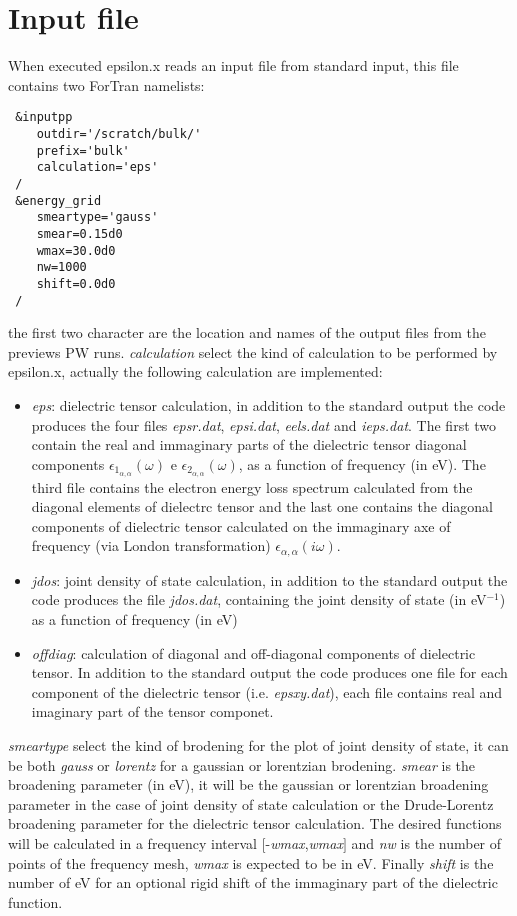 \documentclass[twocolumn]{article}
\begin{document}
\section{Input file}
When executed epsilon.x reads an input file from standard input, this file contains two ForTran namelists:
\begin{verbatim}
 &inputpp
    outdir='/scratch/bulk/'
    prefix='bulk'
    calculation='eps'
 /
 &energy_grid
    smeartype='gauss'
    smear=0.15d0
    wmax=30.0d0
    nw=1000
    shift=0.0d0
 /
\end{verbatim}
the first two character are the location and names of the output files from the previews PW runs. \emph{calculation}
select the kind of calculation to be performed by epsilon.x, actually the following calculation are implemented:
\begin{itemize}
\item  \emph{eps}: dielectric tensor calculation, in addition to the standard output the code produces the four files
\emph{epsr.dat}, \emph{epsi.dat}, \emph{eels.dat} and \emph{ieps.dat}. The first two contain the real and immaginary
parts of the dielectric
tensor diagonal components $\epsilon_{1_{\alpha,\alpha}}(\omega)$ e $\epsilon_{2_{\alpha,\alpha}}(\omega)$,
as a function of frequency (in eV). The third file contains the electron energy loss spectrum calculated from the diagonal
elements of dielectrc tensor and the last one contains the diagonal components of
dielectric tensor calculated on the immaginary axe of frequency (via London transformation)
$\epsilon_{\alpha,\alpha}(i\omega)$.
\item  \emph{jdos}: joint density of state calculation, in addition to the standard output the code produces the file
\emph{jdos.dat}, containing the joint density of state (in eV$^{-1}$) as a function of frequency (in eV)
\item  \emph{offdiag}: calculation of diagonal and off-diagonal components of dielectric tensor. In addition
to the standard output the code produces one file for each component of the dielectric tensor (i.e.
\emph{epsxy.dat}), each file contains real and imaginary part of the tensor componet.
\end{itemize}
\emph{smeartype} select the kind of brodening for the plot of joint density of state, it can be both
\emph{gauss} or \emph{lorentz} for a gaussian or lorentzian brodening. \emph{smear} is the broadening parameter (in eV),
it will be the gaussian or lorentzian broadening parameter in the case of joint density of state calculation or the
Drude-Lorentz broadening parameter for the dielectric tensor calculation.
The desired functions will be calculated in a frequency interval $\big[$-\emph{wmax},\emph{wmax}$\big]$ and \emph{nw}
is the number of points of the frequency mesh, \emph{wmax} is expected to be in eV. Finally \emph{shift} is the number
of eV for an optional rigid shift of the immaginary part of the dielectric function.
\end{document}
